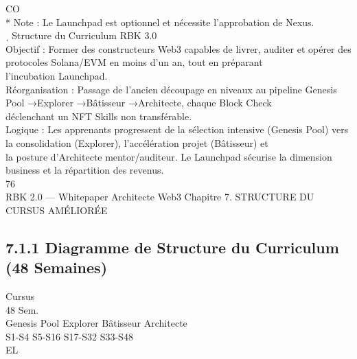 \documentclass[12pt,landscape,a4paper]{article}
\begin{document}
CO\\
* Note : Le Launchpad est optionnel et nécessite l’approbation de Nexus.\\
\vspace{0.5em}
ˌ Structure du Curriculum RBK 3.0\\
\vspace{0.5em}
Objectif : Former des constructeurs Web3 capables de livrer, auditer et opérer des protocoles Solana/EVM en moins d’un an, tout en préparant\\
l’incubation Launchpad.\\
Réorganisation : Passage de l’ancien découpage en niveaux au pipeline Genesis Pool →Explorer →Bâtisseur →Architecte, chaque Block Check\\
déclenchant un NFT Skills non transférable.\\
Logique : Les apprenants progressent de la sélection intensive (Genesis Pool) vers la consolidation (Explorer), l’accélération projet (Bâtisseur) et\\
la posture d’Architecte mentor/auditeur. Le Launchpad sécurise la dimension business et la répartition des revenus.\\
\vspace{0.5em}
\vspace{0.5em}
\vspace{0.5em}
\vspace{0.5em}
76\\
RBK 2.0 — Whitepaper Architecte Web3                                                            Chapitre 7. STRUCTURE DU CURSUS AMÉLIORÉE\\
\vspace{0.5em}
\vspace{0.5em}
\subsection{7.1.1 Diagramme de Structure du Curriculum (48 Semaines)}
\vspace{0.5em}
Cursus\\
48 Sem.\\
\vspace{0.5em}
\vspace{0.5em}
Genesis Pool                        Explorer                          Bâtisseur                         Architecte\\
\vspace{0.5em}
\vspace{0.5em}
S1-S4                            S5-S16                            S17-S32                            S33-S48\\
\vspace{0.5em}
\vspace{0.5em}
\vspace{0.5em}
\vspace{0.5em}
EL\\
\end{document}
